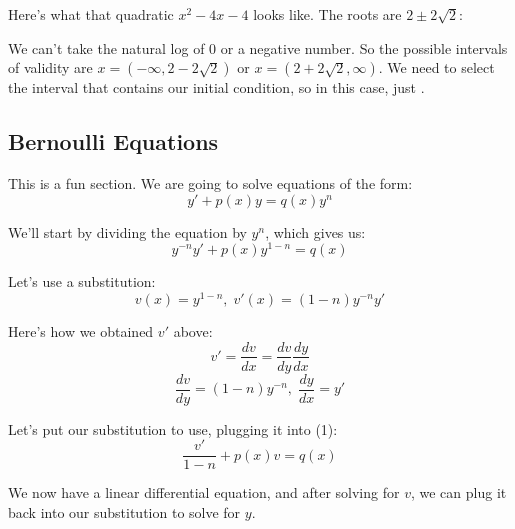 	\pagebreak
	
	Here's what that quadratic $x^{2} - 4x - 4$ looks like. The roots are $2 \pm 2\sqrt{2}$:
	\begin{center}
	\end{center}
	
	We can't take the natural log of 0 or a negative number. So the possible intervals of validity are $x = (-\infty, 2 - 2\sqrt{2})$ or $x = (2 + 2\sqrt{2}, \infty)$. We need to select the interval that contains our initial condition, so in this case, just .
	
	\subsection{Bernoulli Equations}
	This is a fun section. We are going to solve equations of the form:
	$$y' + p(x)y = q(x)y^{n}$$
	
	We'll start by dividing the equation by $y^{n}$, which gives us:
	\begin{equation}
		y^{-n}y' + p(x)y^{1 - n} = q(x)
	\end{equation}
	
	Let's use a substitution:
	$$v(x) = y^{1 - n},\;v'(x) = (1 - n)y^{-n}y'$$
	
	Here's how we obtained $v'$ above:
	$$v' = \frac{dv}{dx} = \frac{dv}{dy}\frac{dy}{dx}$$
	$$\frac{dv}{dy} = (1 - n)y^{-n},\;\frac{dy}{dx} = y'$$
	
	Let's put our substitution to use, plugging it into (1):
	$$\frac{v'}{1 - n} + p(x)v = q(x)$$
	
	We now have a linear differential equation, and after solving for $v$, we can plug it back into our substitution to solve for $y$.
	
